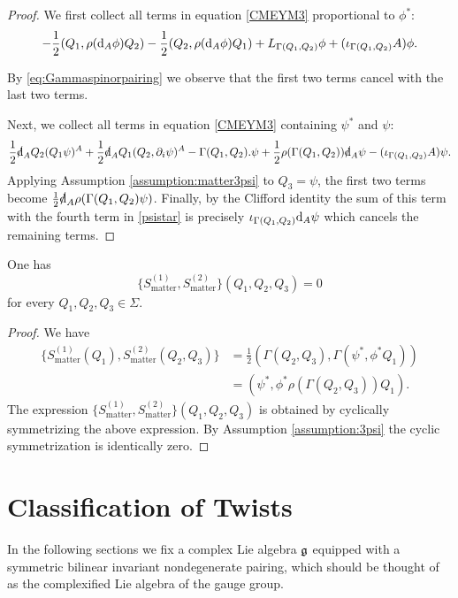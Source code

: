 \documentclass[10pt, oneside]{article}
\newcommand{\matter}{\mathrm{matter}}
\begin{document}
\begin{proof}
We first collect all terms in equation \eqref{CMEYM3} proportional to $\phi^*$:
\[
-\frac{1}{2} (Q_1, \rho({\rm d}_A\phi) Q_2) - \frac{1}{2} (Q_2, \rho({\rm d}_A \phi) Q_1) + L_{\Gamma(Q_1,Q_2)} \phi + (\iota_{\Gamma(Q_1, Q_2)} A)\phi.
\]

By \eqref{eq:Gammaspinorpairing} we observe that the first two terms cancel with the last two terms.

Next, we collect all terms in equation \eqref{CMEYM3} containing $\psi^*$ and $\psi$:
\begin{equation}\label{psistar}
\frac{1}{2} \sd \d_A Q_2(Q_1 \psi)^A + \frac{1}{2} \sd \d_A Q_1(Q_2, \partial_i\psi)^A - \Gamma(Q_1,Q_2) . \psi + \frac{1}{2} \rho(\Gamma(Q_1,Q_2)) \sd \d_A \psi - (\iota_{\Gamma(Q_1, Q_2)} A)\psi.
\end{equation}
Applying Assumption \ref{assumption:matter3psi} to $Q_3 = \psi$, the first two terms become $\frac{1}{2} \sd \d_A \rho(\Gamma(Q_1,Q_2) \psi)$. 
Finally, by the Clifford identity the sum of this term with the fourth term in \eqref{psistar} is precisely $\iota_{\Gamma(Q_1,Q_2)}{\rm d}_A \psi$ which cancels the remaining terms.
\end{proof}

\begin{lemma}
One has
\[\{S_{\matter}^{(1)}, S_{\matter}^{(2)}\}(Q_1, Q_2, Q_3) = 0\]
for every $Q_1, Q_2, Q_3\in \Sigma$.
\end{lemma}
\begin{proof}
We have
\begin{align*}
\{S_{\matter}^{(1)}(Q_1), S_{\matter}^{(2)}(Q_2, Q_3)\} & = \frac{1}{2} (\Gamma(Q_2, Q_3), \Gamma(\psi^*, \phi^* Q_1)) \\ & = (\psi^*, \phi^* \rho(\Gamma(Q_2,Q_3)) Q_1)  .
\end{align*}
The expression
$\{S_{\matter}^{(1)}, S_{\matter}^{(2)}\}(Q_1,Q_2,Q_3)$ is obtained by cyclically symmetrizing the above expression. By Assumption \ref{assumption:3psi} the cyclic symmetrization is identically zero.
\end{proof}

\part{Classification of Twists} \label{classification_part}

In the following sections we fix a complex Lie algebra $\mathfrak g$ equipped with a symmetric bilinear invariant nondegenerate pairing, which should be thought of as the complexified Lie algebra of the gauge group.
\end{document}
